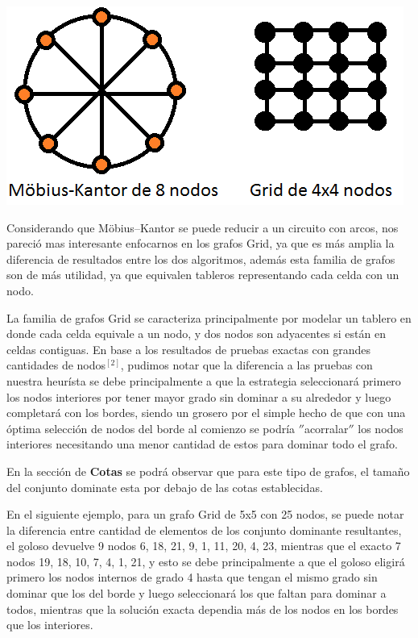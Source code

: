 \begin {center}
\includegraphics{./graficos/mobusygrid.png}
\end {center} 

Considerando que Möbius–Kantor se puede reducir a un circuito con arcos, nos pareció mas interesante enfocarnos en los grafos Grid, ya que es más amplia la diferencia de resultados entre los dos algoritmos, además esta familia de grafos son de más utilidad, ya que equivalen tableros representando cada celda con un nodo.

La familia de grafos Grid se caracteriza principalmente por modelar un tablero en donde cada celda equivale a un nodo, y dos nodos son adyacentes si están en celdas contiguas. En base a los resultados de pruebas exactas con grandes cantidades de nodos$^{[2]}$, pudimos notar que la diferencia a las pruebas con nuestra heurísta se debe principalmente a que la estrategia seleccionará primero los nodos interiores por tener mayor grado sin dominar a su alrededor y luego completará con los bordes, siendo un grosero por el simple hecho de que con una óptima selección de nodos del borde al comienzo se podría $''$acorralar$''$ los nodos interiores necesitando una menor cantidad de estos para dominar todo el grafo. 

En la sección de \textbf{Cotas} se podrá observar que para este tipo de grafos, el tamaño del conjunto dominate esta por debajo de las cotas establecidas.

En el siguiente ejemplo, para un grafo Grid de 5x5 con 25 nodos, se puede notar la diferencia entre cantidad de elementos de los conjunto dominante resultantes, el goloso devuelve 9 nodos {6, 18, 21, 9, 1, 11, 20, 4, 23}, mientras que el exacto 7 nodos {19, 18, 10, 7, 4, 1, 21}, y esto se debe principalmente a que el goloso eligirá primero los nodos internos de grado 4 hasta que tengan el mismo grado sin dominar que los del borde y luego seleccionará los que faltan para dominar a todos, mientras que la solución exacta dependia más de los nodos en los bordes que los interiores.
 

